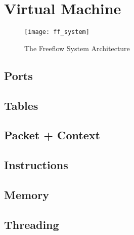 \chapter{Virtual Machine}
\label{vm}

\begin{figure}[h]
\centering
\texttt{[image: ff\_system]}
\caption{The Freeflow System Architecture}
\label{fig:ff_system}
\end{figure}


\section{Ports}
\label{vm:port}

\section{Tables}
\label{vm:tables}

\section{Packet + Context}
\label{vm:context}

\section{Instructions}
\label{vm:insn}

\section{Memory}
\label{vm:memory}

\section{Threading}
\label{vm:threading}
